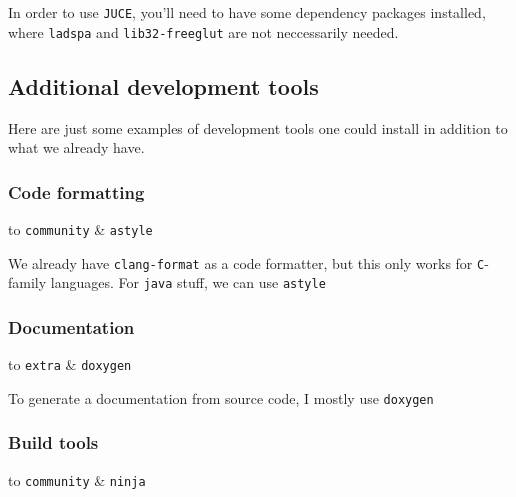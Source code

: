 \documentclass[9pt]{report}
\newenvironment{packagetable}
{\begin{longtabu}to \textwidth [b]{X[1,r]|X[1,l]}}
{\end{longtabu}}
\begin{document}
In order to use \texttt{JUCE}, you’ll need to have some dependency packages installed, where \texttt{ladspa} and \texttt{lib32-freeglut} are not neccessarily needed.



\newpage

\hypertarget{x-additional-development-tools}{\subsection{Additional development tools}}
Here are just some examples of development tools one could install in addition to what we already have.



\newpage

\hypertarget{x-code-formatting}{\subsubsection{Code formatting}}
\begin{packagetable}
    \texttt{community} & \texttt{astyle} \\ 
\end{packagetable}

We already have \texttt{clang-format} as a code formatter, but this only works for \texttt{C}-family languages.
For \texttt{java} stuff, we can use \texttt{astyle}



\newpage

\hypertarget{x-documentation}{\subsubsection{Documentation}}
\begin{packagetable}
    \texttt{extra} & \texttt{doxygen} \\ 
\end{packagetable}

To generate a documentation from source code, I mostly use \texttt{doxygen}



\newpage

\hypertarget{x-build-tools}{\subsubsection{Build tools}}
\begin{packagetable}
    \texttt{community} & \texttt{ninja} \\ 
\end{packagetable}
\end{document}
